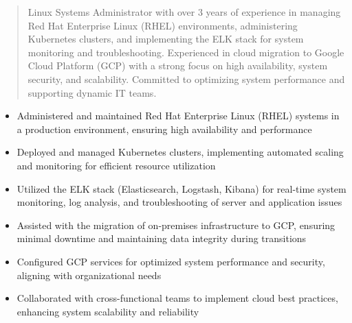 



\makecvheader

\begin{quote}
  \noindent
  Linux Systems Administrator with over 3 years of experience in managing Red Hat Enterprise Linux (RHEL) environments, administering Kubernetes clusters, and implementing the ELK stack for system monitoring and troubleshooting. Experienced in cloud migration to Google Cloud Platform (GCP) with a strong focus on high availability, system security, and scalability. Committed to optimizing system performance and supporting dynamic IT teams.
\end{quote}

\par\smallskip
\noindent
\begin{minipage}{20cm}
  \begin{minipage}{9.75cm}
    \begin{itemize}
      \item Administered and maintained Red Hat Enterprise Linux (RHEL) systems in a production environment, ensuring high availability and performance
      \item Deployed and managed Kubernetes clusters, implementing automated scaling and monitoring for efficient resource utilization
      \item Utilized the ELK stack (Elasticsearch, Logstash, Kibana) for real-time system monitoring, log analysis, and troubleshooting of server and application issues
    \end{itemize}
  \end{minipage}
  \hfill
  \begin{minipage}{9.75cm}
    \begin{itemize}
      \item Assisted with the migration of on-premises infrastructure to GCP, ensuring minimal downtime and maintaining data integrity during transitions
      \item Configured GCP services for optimized system performance and security, aligning with organizational needs
      \item Collaborated with cross-functional teams to implement cloud best practices, enhancing system scalability and reliability
    \end{itemize}
  \end{minipage}
\end{minipage}
\par\smallskip
\divider

